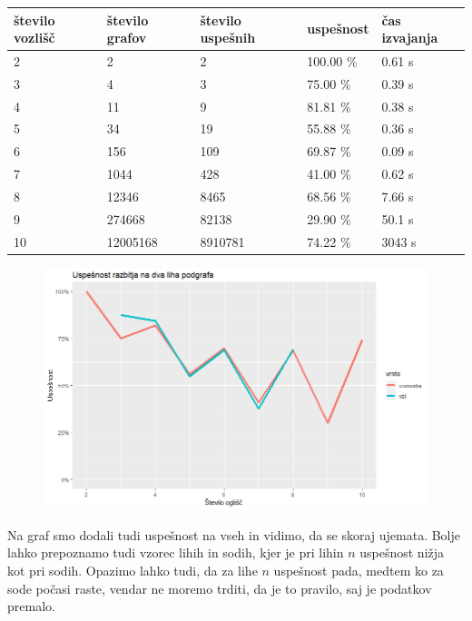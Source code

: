 \documentclass[12pt,a4paper]{amsart}
\theoremstyle{definition} %
\theoremstyle{plain} %
\begin{document}
\begin{adjustbox}{width={\textwidth},totalheight={\textheight},keepaspectratio}%
\begin{tabular}{|l|l|l|l|l|}
\hline
\textbf{število vozlišč} & \textbf{število grafov} & \textbf{število uspešnih} & \textbf{uspešnost} & \textbf{čas izvajanja} \\ \hline
2    & 2            & 2         & 100.00 \%   & 0.61 s     \\ \hline
3    & 4            & 3         & 75.00 \%    & 0.39 s     \\ \hline
4    & 11           & 9         & 81.81 \%    & 0.38 s     \\ \hline
5    & 34           & 19        & 55.88 \%    & 0.36 s     \\ \hline
6    & 156          & 109       & 69.87 \%    & 0.09 s     \\ \hline
7    & 1044         & 428       & 41.00 \%    & 0.62 s     \\ \hline
8    & 12346        & 8465      & 68.56 \%    & 7.66 s     \\ \hline
9    & 274668       & 82138     & 29.90 \%    & 50.1 s     \\ \hline
10   & 12005168     & 8910781   & 74.22 \%    & 3043 s     \\ \hline
\end{tabular}
\end{adjustbox}

\begin{figure}[h]
\centering
\includegraphics[width=1\textwidth]{images/success_isomorphic.png}
\end{figure}

Na graf smo dodali tudi uspešnost na vseh in vidimo, da se skoraj ujemata.
Bolje lahko prepoznamo tudi vzorec lihih in sodih, kjer je pri lihin $n$ uspešnost nižja
kot pri sodih. Opazimo lahko tudi, da za lihe $n$ uspešnost pada, medtem ko za sode počasi raste, vendar
ne moremo trditi, da je to pravilo, saj je podatkov premalo.
\pagebreak
\end{document}
